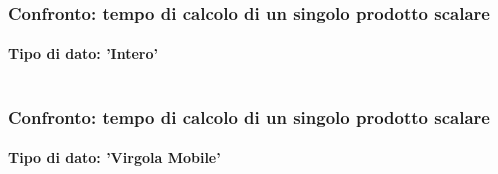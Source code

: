 \documentclass{beamer}
\begin{document}
\begin{frame}
  \frametitle{Confronto: tempo di calcolo di un singolo prodotto scalare}
  \framesubtitle{Tipo di dato: 'Intero'}
  \begin{columns}[c]
    \resizebox{\columnwidth}{!}{}
    \resizebox{\columnwidth}{!}{}
  \end{columns} 
\end{frame}

\begin{frame}
  \frametitle{Confronto: tempo di calcolo di un singolo prodotto scalare}
  \framesubtitle{Tipo di dato: 'Virgola Mobile'}
  \begin{columns}[c]
    \resizebox{\columnwidth}{!}{}
    \resizebox{\columnwidth}{!}{}
  \end{columns} 
\end{frame}
\end{document}
